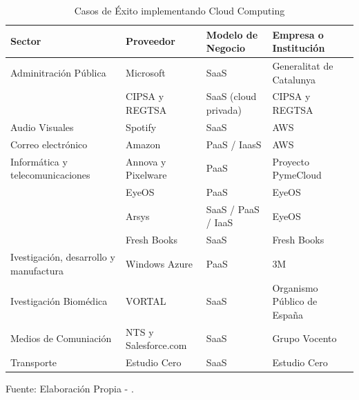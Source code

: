 \documentclass[a4paper, 12pt]{report}
\begin{document}
	\begin{table}[ht]		
		\centering
		\caption{Casos de \'Exito implementando Cloud Computing}
		\label{tablaEmpresas}
		\begin{tabular}{|p{4.2cm} |p{2.3cm} |p{2.5cm} |p{4cm}|} \hline
			\bf{Sector} & \bf{Proveedor} & \bf{Modelo de Negocio} & \bf{Empresa o Institución} 
			\\ \hline \hline
			Adminitraci\'on P\'ublica & Microsoft & SaaS &  Generalitat de Catalunya 
			\\ \cline{2-4}
			 & CIPSA y REGTSA & SaaS (cloud privada) & CIPSA y REGTSA  
			\\ \hline
			Audio Visuales  & Spotify & SaaS & AWS
			\\ \hline
			Correo electr\'onico & Amazon & PaaS / IaasS & AWS
			\\ \hline
			Inform\'atica y telecomunicaciones & Annova y Pixelware & PaaS & Proyecto PymeCloud 
			\\ \cline{2-4}
			 & EyeOS & PaaS & EyeOS  
			\\ \cline{2-4}
			 & Arsys & SaaS / PaaS / IaaS & EyeOS  
			\\  \cline{2-4}
			 & Fresh Books & SaaS & Fresh Books  
			\\  \hline
			Ivestigaci\'on, desarrollo y manufactura & Windows Azure & PaaS & 3M 
			\\ \hline
			Ivestigaci\'on Biom\'edica & VORTAL & SaaS & Organismo P\'ublico de España 
			\\ \hline
			Medios de Comuniaci\'on & NTS y Salesforce.com & SaaS & Grupo Vocento \\ \hline
			Transporte & Estudio Cero & SaaS & Estudio Cero\\ \hline 
		\end{tabular}
		\vskip 0.2cm
		\begin{center}
			{\small{Fuente: Elaboraci\'on Propia - \cite{Ferrari}.}}
		\end{center}
	\end{table}
\end{document}

